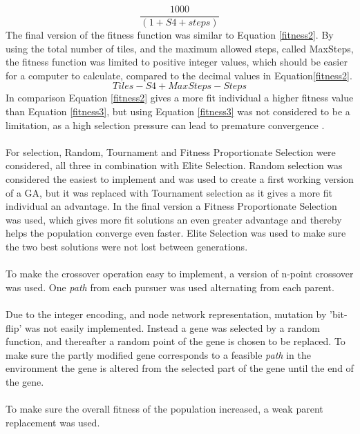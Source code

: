 %
\begin{equation}\label{fitness2} \frac{1000}{(1+S4+steps)} \end{equation}
%
The final version of the fitness function was similar to Equation \eqref{fitness2}. By using the total number of tiles, and the maximum allowed steps, called MaxSteps, the fitness function was limited to positive integer values, which should be easier for a computer to calculate, compared to the decimal values in Equation\eqref{fitness2}.
%
\begin{equation} \label{fitness3}Tiles-S4+MaxSteps-Steps \end{equation}
%
In comparison Equation \eqref{fitness2} gives a more fit individual a higher fitness value than Equation \eqref{fitness3}, but using Equation \eqref{fitness3} was not considered to be a limitation, as a high selection pressure can lead to premature convergence \cite{GAHandbook1}.\\\\
For selection, Random, Tournament  and Fitness Proportionate Selection were considered, all three in combination with Elite Selection. Random selection was considered the easiest to implement and was used to create a first working version of a GA, but it was replaced with Tournament selection as it gives a more fit individual an advantage. In the final version a Fitness Proportionate Selection was used, which gives more fit solutions an even greater advantage and thereby helps the population converge even faster. Elite Selection was used to make sure the two best solutions were not lost between generations.\\\\
To make the crossover operation easy to implement, a version of n-point crossover was used. One \emph{path} from each pursuer was used alternating from each parent.\\\\
Due to the integer encoding, and node network representation, mutation by 'bit-flip' was not easily implemented. Instead a gene was selected by a random function, and thereafter a random point of the gene is chosen to be replaced. To make sure the partly modified gene corresponds to a feasible \emph{path} in the environment the gene is altered from the selected part of the gene until the end of the gene.\\\\
To make sure the overall fitness of the population increased, a weak parent replacement was used.\\\\
